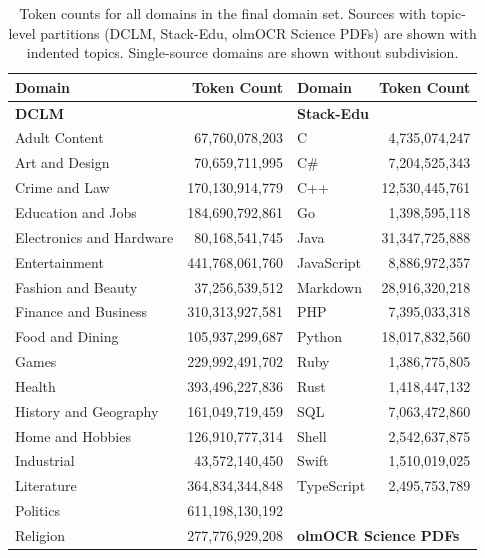 \begin{table}[h]
\centering
\caption{Token counts for all domains in the final domain set. Sources with topic-level partitions (DCLM, Stack-Edu, olmOCR Science PDFs) are shown with indented topics. Single-source domains are shown without subdivision.}
\small
\begin{tabular}{l r | l r}
\toprule
\textbf{Domain} & \textbf{Token Count} & \textbf{Domain} & \textbf{Token Count} \\
\midrule
\multicolumn{2}{l|}{\textbf{DCLM}~\citep{dclm}} & \multicolumn{2}{l}{\textbf{Stack-Edu}~\citep{allal2025smollm2smolgoesbig}} \\
\quad Adult Content & 67,760,078,203 & \quad C & 4,735,074,247 \\
\quad Art and Design & 70,659,711,995 & \quad C\# & 7,204,525,343 \\
\quad Crime and Law & 170,130,914,779 & \quad C++ & 12,530,445,761 \\
\quad Education and Jobs & 184,690,792,861 & \quad Go & 1,398,595,118 \\
\quad Electronics and Hardware & 80,168,541,745 & \quad Java & 31,347,725,888 \\
\quad Entertainment & 441,768,061,760 & \quad JavaScript & 8,886,972,357 \\
\quad Fashion and Beauty & 37,256,539,512 & \quad Markdown & 28,916,320,218 \\
\quad Finance and Business & 310,313,927,581 & \quad PHP & 7,395,033,318 \\
\quad Food and Dining & 105,937,299,687 & \quad Python & 18,017,832,560 \\
\quad Games & 229,992,491,702 & \quad Ruby & 1,386,775,805 \\
\quad Health & 393,496,227,836 & \quad Rust & 1,418,447,132 \\
\quad History and Geography & 161,049,719,459 & \quad SQL & 7,063,472,860 \\
\quad Home and Hobbies & 126,910,777,314 & \quad Shell & 2,542,637,875 \\
\quad Industrial & 43,572,140,450 & \quad Swift & 1,510,019,025 \\
\quad Literature & 364,834,344,848 & \quad TypeScript & 2,495,753,789 \\
\quad Politics & 611,198,130,192 & \multicolumn{2}{l}{} \\
\quad Religion & 277,776,929,208 & \multicolumn{2}{l}{\textbf{olmOCR Science PDFs}~\citep{olmo2025olmo3}} \\

\end{tabular}
\end{table}
